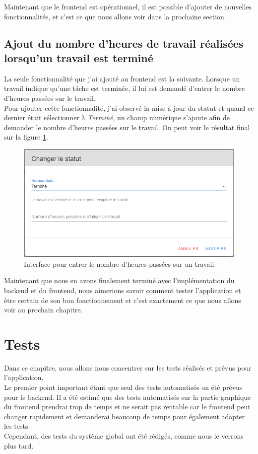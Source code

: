 \documentclass[
    iai, %
    il, %
]{heig-tb}
\begin{document}
Maintenant que le frontend est opérationnel, il est possible d'ajouter de nouvelles fonctionnalités, et c'est ce que nous allons voir dans la prochaine section.

\section{Ajout du nombre d'heures de travail réalisées lorsqu'un travail est terminé}
La seule fonctionnalité que j'ai ajouté au frontend est la suivante. Lorsque un travail indique qu'une tâche est terminée, il lui est demandé d'entrer le nombre d'heures passées sur le travail. \\
Pour ajouter cette fonctionnalité, j'ai observé la mise à jour du statut et quand ce dernier était sélectionner à \emph{Terminé}, un champ numérique s'ajoute afin de demander le nombre d'heures passées sur le travail. On peut voir le résultat final sur la figure \ref{nb-worked-hours}.

\begin{center}
    \begin{figure}
        \includegraphics[width=\textwidth]{./assets/figures/nb-worked-hours.png}
        \caption{Interface pour entrer le nombre d'heures passées sur un travail \label{nb-worked-hours}}
    \end{figure}
\end{center}

Maintenant que nous en avons finalement terminé avec l'implémentation du \Gls{backend} et du \Gls{frontend}, nous aimerions savoir comment tester l'application et être certain de son bon fonctionnement et c'est exactement ce que nous allons voir au prochain chapitre.

\chapter{Tests}
Dans ce chapitre, nous allons nous concentrer sur les tests réalisés et prévus pour l'application. \\
Le premier point important étant que seul des tests automatisés on été prévus pour le \Gls{backend}. Il a été estimé que des tests automatisés sur la partie graphique du \Gls{frontend} prendrai trop de temps et ne serait pas rentable car le frontend peut changer rapidement et demanderai beaucoup de temps pour également adapter les tests. \\
Cependant, des tests du système global ont été rédigés, comme nous le verrons plus tard.
\end{document}
